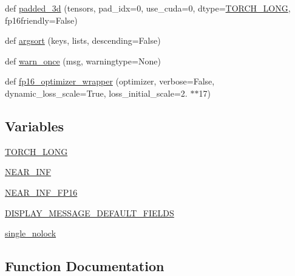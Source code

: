 \begin{DoxyCompactItemize}
\item 
def \hyperlink{namespaceparlai_1_1utils_1_1misc_ad96b0c9ef6237d9ca051251089faf2c7}{padded\+\_\+3d} (tensors, pad\+\_\+idx=0, use\+\_\+cuda=0, dtype=\hyperlink{namespaceparlai_1_1utils_1_1misc_ac49ec9bcd5fe586085eb9fab8f40fdb5}{T\+O\+R\+C\+H\+\_\+\+L\+O\+NG}, fp16friendly=False)
\item 
def \hyperlink{namespaceparlai_1_1utils_1_1misc_a9e330c9119522333c738a3175e0b4396}{argsort} (keys, lists, descending=False)
\item 
def \hyperlink{namespaceparlai_1_1utils_1_1misc_acf146e70ea7f6867969a7c2b545d4b4b}{warn\+\_\+once} (msg, warningtype=None)
\item 
def \hyperlink{namespaceparlai_1_1utils_1_1misc_a7836ac7469dc5744e0ad9e5e54da2396}{fp16\+\_\+optimizer\+\_\+wrapper} (optimizer, verbose=False, dynamic\+\_\+loss\+\_\+scale=True, loss\+\_\+initial\+\_\+scale=2. $\ast$$\ast$17)
\end{DoxyCompactItemize}
\subsection*{Variables}
\begin{DoxyCompactItemize}
\item 
\hyperlink{namespaceparlai_1_1utils_1_1misc_ac49ec9bcd5fe586085eb9fab8f40fdb5}{T\+O\+R\+C\+H\+\_\+\+L\+O\+NG}
\item 
\hyperlink{namespaceparlai_1_1utils_1_1misc_a8e586e6abf9e695442a00ac47424ad31}{N\+E\+A\+R\+\_\+\+I\+NF}
\item 
\hyperlink{namespaceparlai_1_1utils_1_1misc_affd7d3c0575a748a52a66e092fb31a35}{N\+E\+A\+R\+\_\+\+I\+N\+F\+\_\+\+F\+P16}
\item 
\hyperlink{namespaceparlai_1_1utils_1_1misc_a122146c75d0e6910340a6a851d097bdc}{D\+I\+S\+P\+L\+A\+Y\+\_\+\+M\+E\+S\+S\+A\+G\+E\+\_\+\+D\+E\+F\+A\+U\+L\+T\+\_\+\+F\+I\+E\+L\+DS}
\item 
\hyperlink{namespaceparlai_1_1utils_1_1misc_a5d6ad7f3aef96f16bb9060f5a41fc39b}{single\+\_\+nolock}
\end{DoxyCompactItemize}


\subsection{Function Documentation}
\mbox{\label{namespaceparlai_1_1utils_1_1misc_a9e330c9119522333c738a3175e0b4396}} 
